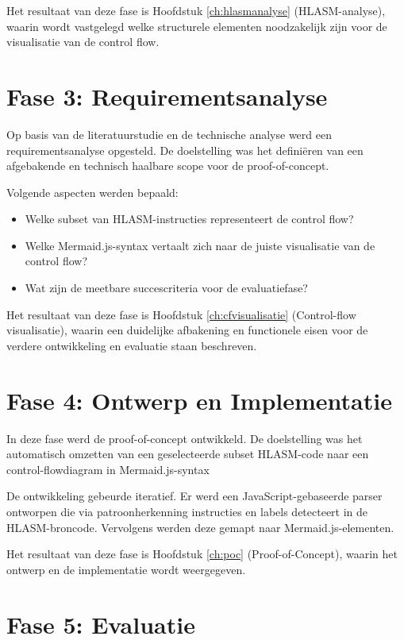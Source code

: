 \newpage

Het resultaat van deze fase is Hoofdstuk \ref{ch:hlasmanalyse} (HLASM-analyse), waarin wordt vastgelegd welke structurele elementen noodzakelijk zijn voor de visualisatie van de control flow.

\section{Fase 3: Requirementsanalyse}

Op basis van de literatuurstudie en de technische analyse werd een requirementsanalyse opgesteld. De doelstelling was het definiëren van een afgebakende en technisch haalbare scope voor de proof-of-concept.

Volgende aspecten werden bepaald:

\begin{itemize}
    \item Welke subset van HLASM-instructies representeert de control flow? 
    \item Welke Mermaid.js-syntax vertaalt zich naar de juiste visualisatie van de control flow?
    \item Wat zijn de meetbare succescriteria voor de evaluatiefase?
\end{itemize}

Het resultaat van deze fase is Hoofdstuk \ref{ch:cfvisualisatie} (Control-flow visualisatie), waarin een duidelijke afbakening en functionele eisen voor de verdere ontwikkeling en evaluatie staan beschreven. 

\section{Fase 4: Ontwerp en Implementatie}

In deze fase werd de proof-of-concept ontwikkeld. De doelstelling was het automatisch omzetten van een geselecteerde subset HLASM-code naar een control-flowdiagram in Mermaid.js-syntax

De ontwikkeling gebeurde iteratief. Er werd een JavaScript-gebaseerde parser ontworpen die via patroonherkenning instructies en labels detecteert in de HLASM-broncode. Vervolgens werden deze gemapt naar Mermaid.js-elementen.

Het resultaat van deze fase is Hoofdstuk \ref{ch:poc} (Proof-of-Concept), waarin het ontwerp en de implementatie wordt weergegeven. 

\newpage

\section{Fase 5: Evaluatie}

